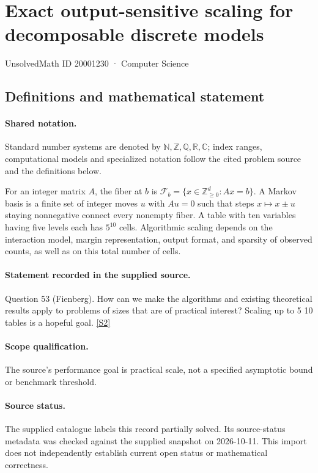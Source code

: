 \documentclass[11pt]{article}
\newcommand{\sref}[2]{\hyperlink{source:#1:#2}{[S#2]}}
\begin{document}
\setcounter{section}{20001229}
\section{Exact output-sensitive scaling for decomposable discrete models}\label{20001230}
{\small\sffamily UnsolvedMath ID 20001230 · Computer Science}
\subsection{Definitions and mathematical statement}

\paragraph{Shared notation.}Standard number systems are denoted by $\mathbb N,\mathbb Z,\mathbb Q,\mathbb R,\mathbb C$; index ranges, computational models and specialized notation follow the cited problem source and the definitions below.


For an integer matrix $A$, the fiber at $b$ is $\mathcal F_b=\{x\in\mathbb Z_{\ge0}^d:Ax=b\}$. A Markov basis is a finite set of integer moves $u$ with $Au=0$ such that steps $x\mapsto x\pm u$ staying nonnegative connect every nonempty fiber. A table with ten variables having five levels each has $5^{10}$ cells. Algorithmic scaling depends on the interaction model, margin representation, output format, and sparsity of observed counts, as well as on this total number of cells.
\paragraph{Statement recorded in the supplied source.}
Question 53 (Fienberg). How can we make the algorithms and existing theoretical results apply to problems of sizes that are of practical interest? Scaling up to 5 10 tables is a hopeful goal. \sref{20001230}{2}
\paragraph{Scope qualification.}
The source's performance goal is practical scale, not a specified asymptotic bound or benchmark threshold.
\paragraph{Source status.}
The supplied catalogue labels this record partially solved. Its source-status metadata was checked against the supplied snapshot on 2026-10-11. This import does not independently establish current open status or mathematical correctness.
\end{document}
